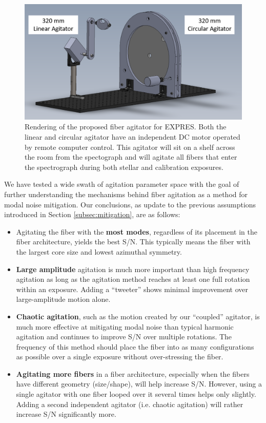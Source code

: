 \documentclass[twocolumn]{emulateapj}
\begin{document}
\begin{figure}
\centering
	\includegraphics[width=\columnwidth]{images/agitator_model.pdf}
	\caption{Rendering of the proposed fiber agitator for EXPRES. Both the linear and circular agitator have an independent DC motor operated by remote computer control. This agitator will sit on a shelf across the room from the spectograph and will agitate all fibers that enter the spectrograph during both stellar and calibration exposures.}
\label{fig:agitator_model}
\end{figure}

We have tested a wide swath of agitation parameter space with the goal of further understanding the mechanisms behind fiber agitation as a method for modal noise mitigation. Our conclusions, as update to the previous assumptions introduced in Section \ref{subsec:mitigation}, are as follows:
\begin{itemize}
\item Agitating the fiber with the \textbf{most modes}, regardless of its placement in the fiber architecture, yields the best S/N. This typically means the fiber with the largest core size and lowest azimuthal symmetry.
\item \textbf{Large amplitude} agitation is much more important than high frequency agitation as long as the agitation method reaches at least one full rotation within an exposure. Adding a ``tweeter'' shows minimal improvement over large-amplitude motion alone.
\item \textbf{Chaotic agitation}, such as the motion created by our ``coupled'' agitator, is much more effective at mitigating modal noise than typical harmonic agitation and continues to improve S/N over multiple rotations. The frequency of this method should place the fiber into as many configurations as possible over a single exposure without over-stressing the fiber.
\item \textbf{Agitating more fibers} in a fiber architecture, especially when the fibers have different geometry (size/shape), will help increase S/N. However, using a single agitator with one fiber looped over it several times helps only slightly. Adding a second independent agitator (i.e. chaotic agitation) will rather increase S/N significantly more.
\end{itemize}
\end{document}
